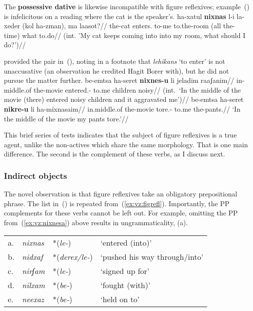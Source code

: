 The \textbf{possessive dative} is likewise incompatible with figure reflexives; example~(\nextx) is infelicitous on a reading where the cat is the speaker's.
\ex \begingl
	\gla\ljudge{\#}ha-xatul \textbf{nixnas} l-i la-xeder (kol ha-zman), ma laasot?//
	\glb the-cat enters. to-me to.the-room (all the-time) what to.do//
	\glft (int. 'My cat keeps coming into into my room, what should I do?')//
	\endgl
\xe

\citet[134]{shlonsky87} provided the pair in~(\nextx), noting in a footnote that \emph{lehikans} `to enter' is not unaccusative (an observation he credited Hagit Borer with), but he did not pursue the matter further.
\pex
	\a \ljudge{*} \begingl
		\gla be-emtsa ha-seret \textbf{nixnes-u} li jeladim raaʃanim//
		\glb in-middle.of the-movie entered.- to.me children noisy//
		\glft (int.~`In the middle of the movie (there) entered noisy children and it aggravated me')//
		\endgl
	\a \begingl
		\gla be-emtsa ha-seret \textbf{nikre-u} li ha-mixnasaim//
		\glb in.middle.of the-movie tore.- to.me the-pants.//
		\glft `In the middle of the movie my pants tore.'//
		\endgl
\xe

This brief series of tests indicates that the subject of figure reflexives is a true agent, unlike the non-actives which share the same morphology. That is one main difference. The second is the complement of these verbs, as I discuss next.

	\subsubsection{Indirect objects} \label{vz:tnif:figrefl:pp}
The novel observation is that figure reflexives take an obligatory prepositional phrase. The list in~(\nextx) is repeated from~(\ref{ex:vz:figrefl}). Importantly, the PP complements for these verbs cannot be left out. For example, omitting the PP from~(\ref{ex:vz:nixnesa}) above results in ungrammaticality, (\anextx a).
\ex \begin{tabular}{l>{\em}lll}
	a.& nixnas &  *(\emph{le-}) & `entered (into)'\\
	b.& nidxaf & *(\emph{derex/le-})  & `pushed his way through/into' \\
	c.& nirʃam & *(\emph{le-})  & `signed up for' \\
	d.& nilxam & *(\emph{be-}) & `fought (with)' \\
	e.& neexaz & *(\emph{be-}) & `held on to' \\
    \end{tabular}
\xe

